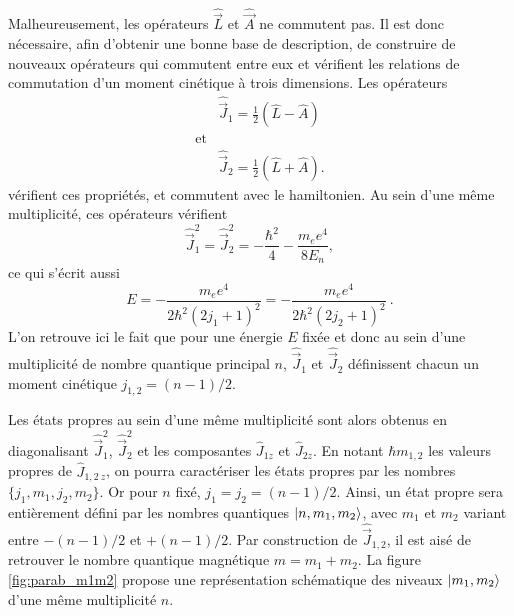 Malheureusement, les opérateurs $\hat{\vec{L}}$ et $\hat{\vec{A}}$ ne commutent pas.
Il est donc nécessaire, afin d'obtenir une bonne base de description, de construire de nouveaux opérateurs qui commutent entre eux et vérifient les relations de commutation d'un moment cinétique à trois dimensions.
Les opérateurs
\begin{equation}\label{eq:defJ1J2}
\begin{aligned}
&\hat{\vec{J}}_1 = \frac{1}{2}\left( \hat{L} - \hat{A} \right)\\
\text{et} & \\
&\hat{\vec{J}}_2 = \frac{1}{2}\left( \hat{L} + \hat{A} \right).
\end{aligned}
\end{equation}
vérifient ces propriétés, et commutent avec le hamiltonien.
Au sein d'une même multiplicité, ces opérateurs vérifient 
\begin{equation}\label{eq:defJ1J2sq}
\hat{\vec{J}}_1^2 = \hat{\vec{J}}_2^2 = -\frac{\hbar^2}{4}-\frac{m_ee^4}{8E_n},
\end{equation}
ce qui s'écrit aussi
\begin{equation}\label{eq:E_j1_j2}
E=-\frac{m_ee^4}{2\hbar^2(2j_1+1)^2}=-\frac{m_ee^4}{2\hbar^2(2j_2+1)^2}~.
\end{equation}
L'on retrouve ici le fait que pour une énergie $E$ fixée et donc au sein d'une multiplicité de nombre quantique principal $n$, $\hat{\vec{J}}_1$ et $\hat{\vec{J}}_2$ définissent chacun un moment cinétique $j_{1,2}=(n-1)/2$.

Les états propres au sein d'une même multiplicité sont alors obtenus en diagonalisant $\hat{\vec{J}}_1^2$, $\hat{\vec{J}}_2^2$ et les composantes $\hat{J}_{1z}$ et $\hat{J}_{2z}$.
En notant $\hbar m_{1,2}$ les valeurs propres de $\hat{J}_{1,2~z}$, on pourra caractériser les états propres par les nombres $\{j_1,m_1,j_2,m_2\}$.
Or pour $n$ fixé, $j_1=j_2=(n-1)/2$. Ainsi, un état propre sera entièrement défini par les nombres quantiques $\ket{n,m_1,m_2}$, avec $m_1$ et $m_2$ variant entre $-(n-1)/2$ et $+(n-1)/2$.
Par construction de $\hat{\vec{J}}_{1,2}$, il est aisé de retrouver le nombre quantique magnétique $m=m_1+m_2$.
La figure \eqref{fig:parab_m1m2} propose une représentation schématique des niveaux $\ket{m_1,m_2}$ d'une même multiplicité $n$.

